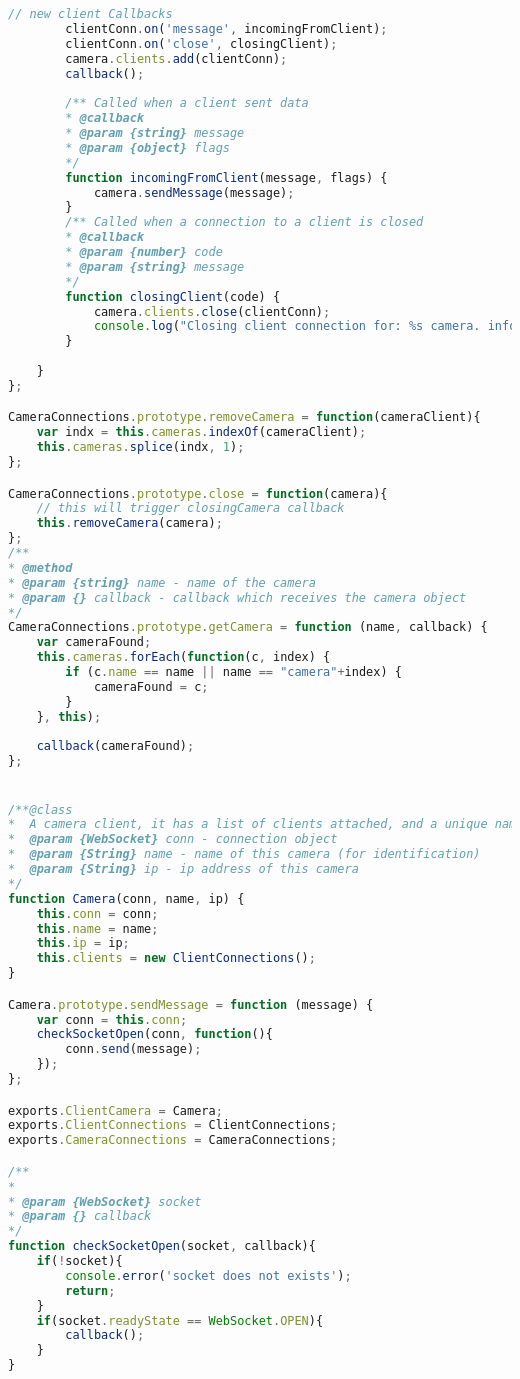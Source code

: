 \documentclass[hidelinks,11pt,a4paper,oneside,article]{memoir}
\begin{document}
\begin{lstlisting}[label={listing:nodejsimplementation},caption={implementation of server-side classes},language=JavaScript, style=styleprogramming]
        // new client Callbacks
        clientConn.on('message', incomingFromClient);
        clientConn.on('close', closingClient);
        camera.clients.add(clientConn);
        callback();
        
        /** Called when a client sent data
        * @callback
        * @param {string} message 
        * @param {object} flags 
        */
        function incomingFromClient(message, flags) {
            camera.sendMessage(message);
        }
        /** Called when a connection to a client is closed
        * @callback
        * @param {number} code 
        * @param {string} message 
        */
        function closingClient(code) {
            camera.clients.close(clientConn);
            console.log("Closing client connection for: %s camera. info: %d, %s", camera.name, code);
        }
        
    }
};

CameraConnections.prototype.removeCamera = function(cameraClient){
    var indx = this.cameras.indexOf(cameraClient);
    this.cameras.splice(indx, 1);
};

CameraConnections.prototype.close = function(camera){
    // this will trigger closingCamera callback
    this.removeCamera(camera);
};
/**
* @method
* @param {string} name - name of the camera
* @param {} callback - callback which receives the camera object
*/
CameraConnections.prototype.getCamera = function (name, callback) {
    var cameraFound;
    this.cameras.forEach(function(c, index) {
        if (c.name == name || name == "camera"+index) {
            cameraFound = c;
        }
    }, this);
    
    callback(cameraFound);
};


/**@class
*  A camera client, it has a list of clients attached, and a unique name
*  @param {WebSocket} conn - connection object
*  @param {String} name - name of this camera (for identification)
*  @param {String} ip - ip address of this camera
*/
function Camera(conn, name, ip) {
    this.conn = conn;
    this.name = name;
    this.ip = ip;
    this.clients = new ClientConnections();
}

Camera.prototype.sendMessage = function (message) {
    var conn = this.conn;
    checkSocketOpen(conn, function(){
        conn.send(message);
    });
};

exports.ClientCamera = Camera;
exports.ClientConnections = ClientConnections;
exports.CameraConnections = CameraConnections;

/**
* 
* @param {WebSocket} socket 
* @param {} callback
*/
function checkSocketOpen(socket, callback){
    if(!socket){
        console.error('socket does not exists');
        return;
    }
    if(socket.readyState == WebSocket.OPEN){
        callback();
    }
}
\end{lstlisting}
\end{document}
